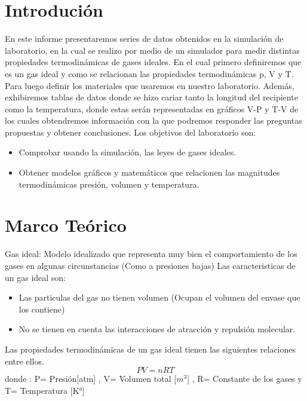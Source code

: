 \documentclass[]{article}
\begin{document}
\section{Introdución}
En este informe presentaremos series de datos obtenidos en la simulación de laboratorio, en la cual se realizo por medio de un simulador para medir distintas propiedades termodinámicas de gases ideales.
En el cual primero definiremos que es un gas ideal y como se relacionan las propiedades termodinámicas p, V y T. Para luego definir los materiales que usaremos en nuestro laboratorio.
Además, exhibiremos tablas de datos donde se hizo cariar tanto la longitud del recipiente como la temperatura, donde estas serán representadas en gráficos V-P y T-V de los cuales obtendremos información con la que podremos responder las preguntas propuestas y obtener conclusiones.
Los objetivos del laboratorio son:
 \begin{itemize}  %
      \item Comprobar usando la simulación, las leyes de gases ideales.
      \item Obtener modelos gráficos y matemáticos que relacionen las magnitudes termodinámicas presión,
      volumen y temperatura.
\end{itemize}


\section{Marco Teórico}
Gas ideal: Modelo idealizado que representa muy bien el comportamiento 
de los gases en algunas circunstancias (Como a presiones bajas)
Las caracteristicas de un gas ideal son:
\begin{itemize}
      \item Las particulas del gas no tienen volumen (Ocupan el volumen del envase que los contiene)
      \item No se tienen en cuenta las interacciones de atracción y repulsión molecular.
\end{itemize}
Las propiedades termodinámicas de un gas ideal tienen las siguientes relaciones entre ellos.
\begin{equation*}
      PV=nRT
\end{equation*}
donde :
P= Presión[atm]   , V= Volumen total [$m^3$] , R= Constante de los gases  y  T= Temperatura [K°]

\newpage
\end{document}
